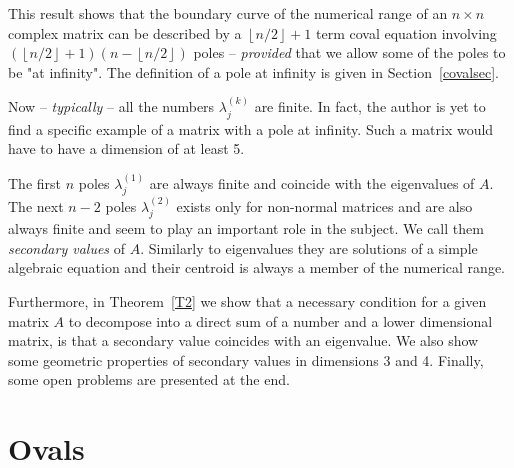 \documentclass[10pt,a4paper,reqno]{amsart}
\newcommand{\trunc}[1]{\left\lfloor #1 \right\rfloor}
\begin{document}
This result shows that the boundary curve of the numerical range of an $n\times n$ complex matrix can be described by a $\trunc{n/2}+1$ term coval equation involving $(\trunc{n/2}+1)(n-\trunc{n/2})$ poles -- \textit{provided} that we allow some of the poles to be "at infinity". The definition of a pole at infinity is given in Section~\ref{covalsec}. 

Now -- \textit{typically} -- all the numbers $\lambda^{(k)}_j$ are finite. In fact, the author is yet to find a specific example of a matrix with a pole at infinity. Such a matrix would have to have a dimension of at least 5. 
 
The first $n$ poles $\lambda_j^{(1)}$ are always finite and coincide with the eigenvalues of $A$. The next $n-2$ poles $\lambda^{(2)}_j$ exists only for non-normal matrices and are also always finite and seem to play an important role in the subject. We call them \textit{secondary values} of $A$. Similarly to eigenvalues they are solutions of a simple algebraic equation and their centroid is always a member of the numerical range. 

Furthermore, in Theorem~\ref{T2} we show that a necessary condition for a given matrix $A$ to decompose into a direct sum of a number and a lower dimensional matrix, is that a secondary value coincides with an eigenvalue. We also show some geometric properties of secondary values in dimensions 3 and 4. Finally, some open problems are presented at the end.

\section{Ovals}\label{ovalsec}
\end{document}
